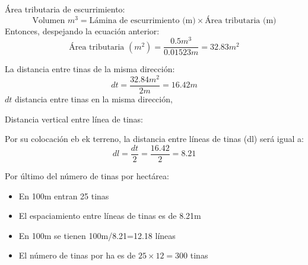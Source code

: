\begin{example}
    Área tributaria de escurrimiento:
    \begin{equation}
        \text{Volumen }m^3=\text{Lámina de escurrimiento (m)}\times \text{Área tributaria (m)}
    \end{equation}
    Entonces, despejando la ecuación anterior:
    \begin{equation*}
        \text{Área tributaria }(m^2)= \frac{0.5m^3}{0.01523m}= 32.83m^2
    \end{equation*}
    
    La distancia entre tinas de la misma dirección:
    \begin{equation*}
        dt = \frac{32.84m^2}{2m} = 16.42m
    \end{equation*}
    $dt$ distancia entre tinas en la misma dirección,
    
    Distancia vertical entre línea de tinas:
    
    Por su colocación eb ek terreno, la distancia entre líneas de tinas (dl) será igual a:
    \begin{equation*}
        dl =\frac{dt}{2} = \frac{16.42}{2} = 8.21
    \end{equation*}
    
    Por último del número de tinas por hectárea:
    \begin{itemize}
        \item En 100m entran 25 tinas
        \item El espaciamiento entre líneas de tinas es de  8.21m
        \item En 100m se tienen 100m/8.21=12.18 líneas
        \item El número de tinas por ha es de $25\times 12=300$ tinas
    \end{itemize}   
    \end{example}


